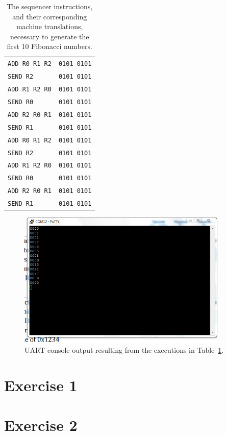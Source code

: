 \documentclass[]{article}
\begin{document}
\begin{table}[H]
\begin{tabular}{ l | l }
\texttt{ADD R0 R1 R2} & \texttt{0101 0101}\\
\texttt{SEND R2} & \texttt{0101 0101}\\
\texttt{ADD R1 R2 R0} & \texttt{0101 0101}\\
\texttt{SEND R0} & \texttt{0101 0101}\\
\texttt{ADD R2 R0 R1} & \texttt{0101 0101}\\
\texttt{SEND R1} & \texttt{0101 0101}\\
\texttt{ADD R0 R1 R2} & \texttt{0101 0101}\\
\texttt{SEND R2} & \texttt{0101 0101}\\
\texttt{ADD R1 R2 R0} & \texttt{0101 0101}\\
\texttt{SEND R0} & \texttt{0101 0101}\\
\texttt{ADD R2 R0 R1} & \texttt{0101 0101}\\
\texttt{SEND R1} & \texttt{0101 0101}\\
\end{tabular}
\caption{The sequencer instructions, and their corresponding machine translations, necessary to generate the first 10 Fibonacci numbers.}
\label{table:fib}
\end{table}

\begin{figure}[H]
\centering
\includegraphics[width=10cm]{fib.png}
\caption{UART console output resulting from the executions in Table~\ref{table:fib}.}
\end{figure}

\section{Exercise 1}


\section{Exercise 2}

\end{document}
